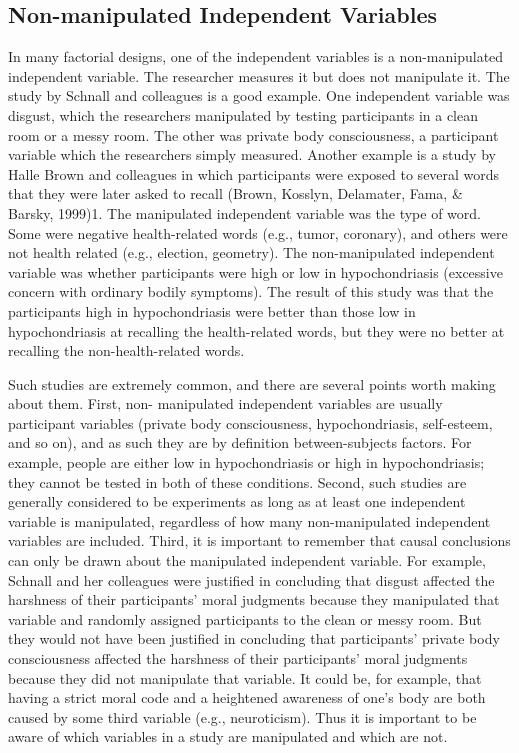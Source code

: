 \subsection{Non-manipulated Independent Variables}

In many factorial designs, one of the independent variables is a non-manipulated independent variable. The researcher measures it but does not manipulate it. The study by Schnall and colleagues is a good example. One independent variable was disgust, which the researchers manipulated by testing participants in a clean room or a messy room. The other was private body consciousness, a participant variable which the researchers simply measured. Another example is a study by Halle Brown and colleagues in which participants were exposed to several words that they were later asked to recall (Brown, Kosslyn, Delamater, Fama, \& Barsky, 1999)1. The manipulated independent variable was the type of word. Some were negative health-related words (e.g., tumor, coronary), and others were not health related (e.g., election, geometry). The non-manipulated independent variable was whether participants were high or low in hypochondriasis (excessive concern with ordinary bodily symptoms). The result of this study was that the participants high in hypochondriasis were better than those low in hypochondriasis at recalling the health-related words, but they were no better at recalling the non-health-related words.

Such studies are extremely common, and there are several points worth making about them. First, non- manipulated independent variables are usually participant variables (private body consciousness, hypochondriasis, self-esteem, and so on), and as such they are by definition between-subjects factors. For example, people are either low in hypochondriasis or high in hypochondriasis; they cannot be tested in both of these conditions. Second, such studies are generally considered to be experiments as long as at least one independent variable is manipulated, regardless of how many non-manipulated independent variables are included. Third, it is important to remember that causal conclusions can only be drawn about the manipulated independent variable. For example, Schnall and her colleagues were justified in concluding that disgust affected the harshness of their participants' moral judgments because they manipulated that variable and randomly assigned participants to the clean or messy room. But they would not have been justified in concluding that participants' private body consciousness affected the harshness of their participants' moral judgments because they did not manipulate that variable. It could be, for example, that having a strict moral code and a heightened awareness of one's body are both caused by some third variable (e.g., neuroticism). Thus it is important to be aware of which variables in a study are manipulated and which are not.

